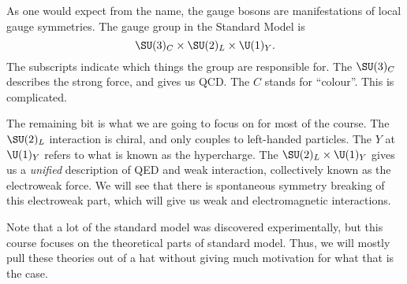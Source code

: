 \documentclass[a4paper]{article}
\begin{document}
As one would expect from the name, the gauge bosons are manifestations of local gauge symmetries. The gauge group in the Standard Model is
\[
  \SU(3)_C \times \SU(2)_L \times \U(1)_Y.
\]
The subscripts indicate which things the group are responsible for. The $\SU(3)_C$ describes the strong force, and gives us QCD. The $C$ stands for ``colour''. This is complicated.

The remaining bit is what we are going to focus on for most of the course. The $\SU(2)_L$ interaction is chiral, and only couples to left-handed particles. The $Y$ at $\U(1)_Y$ refers to what is known as the hypercharge. The $\SU(2)_L \times \U(1)_Y$ gives us a \emph{unified} description of QED and weak interaction, collectively known as the electroweak force. We will see that there is spontaneous symmetry breaking of this electroweak part, which will give us weak and electromagnetic interactions.

Note that a lot of the standard model was discovered experimentally, but this course focuses on the theoretical parts of standard model. Thus, we will mostly pull these theories out of a hat without giving much motivation for what that is the case.
\end{document}

